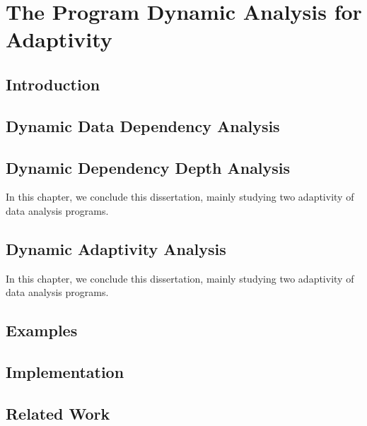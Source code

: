 \chapter{The Program Dynamic Analysis for Adaptivity}
\label{ch:dynamic}

\section{Introduction}
\label{sec:dynamic-intro}
% 

\section{Dynamic Data Dependency Analysis}
\label{sec:dynamic-datadep}
%
\section{Dynamic Dependency Depth Analysis}
\label{sec:dynamic-reachability}
In this chapter, we conclude this dissertation, mainly studying two adaptivity of data analysis programs.

%
\section{Dynamic Adaptivity Analysis}
\label{sec:dynamic-dynamic}
In this chapter, we conclude this dissertation, mainly studying two adaptivity of data analysis programs.

%
\section{Examples}
\label{sec:dynamic-examples}
% 
%
\section{Implementation}
\label{sec:dynamic-implementation}
%
\section{Related Work}
\label{sec:dynamic-relatedwork}
% 